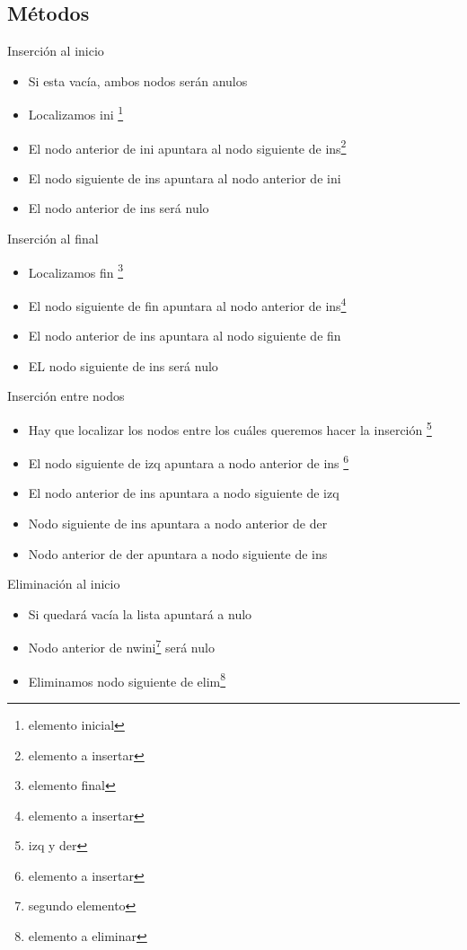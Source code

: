 \documentclass{beamer}
\begin{document}
\subsection{M\'etodos}

\begin{frame}{Inserci\'on al inicio}
	\begin{itemize}
		\item Si esta vac\'ia, ambos nodos serán anulos
		\item Localizamos ini \footnote{elemento inicial}
		\item El nodo anterior de ini apuntara al nodo siguiente de ins\footnote{elemento a insertar}
		\item El nodo siguiente de ins apuntara al nodo anterior de ini
		\item El nodo anterior de ins ser\'a nulo
	\end{itemize}
\end{frame}

\begin{frame}{Inserci\'on al final}
	\begin{itemize}
		\item Localizamos fin \footnote{elemento final}
		\item El nodo siguiente de fin apuntara al nodo anterior de ins\footnote{elemento a insertar}
		\item El nodo anterior de ins apuntara al nodo siguiente de fin
		\item EL nodo siguiente de ins ser\'a nulo
	\end{itemize}
\end{frame}

\begin{frame}{Inserci\'on entre nodos}
	\begin{itemize}
		\item Hay que localizar los nodos entre los cu\'ales queremos hacer la inserci\'on \footnote{izq y der}
		\item El nodo siguiente de izq apuntara a nodo anterior de ins \footnote{elemento a insertar}
		\item El nodo anterior de ins apuntara a nodo siguiente de izq
		\item Nodo siguiente de ins apuntara a nodo anterior de der
		\item Nodo anterior de der apuntara a nodo siguiente de ins
	\end{itemize}
\end{frame}

\begin{frame}{Eliminaci\'on al inicio}
	\begin{itemize}
		\item Si quedar\'a vac\'ia la lista apuntar\'a a nulo
		\item Nodo anterior de nwini\footnote{segundo elemento} ser\'a nulo 
		\item Eliminamos nodo siguiente de elim\footnote{elemento a eliminar}
	\end{itemize}
\end{frame}
\end{document}
